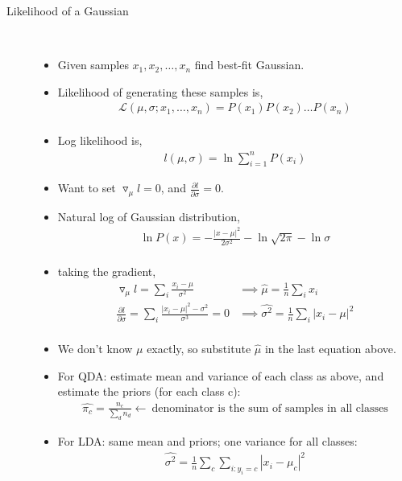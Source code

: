 \documentclass[10pt]{article}
\begin{document}
\begin{description}
	\item[Likelihood of a Gaussian]
		\
		\begin{itemize}
			\item Given samples $x_{1}, x_{2}, \dots, x_{n}$ find best-fit Gaussian.
			\item Likelihood of generating these samples is,
				\begin{align*}
					\mathcal{L}(\mu, \sigma;x_{1}, \dots, x_{n}) = P(x_{1})P(x_{2}) \dots P(x_{n})\\
				\end{align*}
			\item Log likelihood is,
				\begin{align*}
					l(\mu, \sigma) = \ln \sum_{i=1}^{n} P(x_{i})
				\end{align*}
			\item Want to set $\triangledown_{\mu} l = 0$, and  $\frac{\partial l}{\partial \sigma} = 0$.
			\item Natural log of Gaussian distribution,
				\begin{align*}
					\ln P(x) = -\frac{|x-\mu|^{2}}{2\sigma^{2}} - \ln \sqrt{2\pi} - \ln \sigma\\
				\end{align*}
			\item taking the gradient,
				\begin{align*}
					\triangledown_{\mu}l = \sum_{i} \frac{x_{i}-\mu}{\sigma^{2}} &\implies \hat{\mu} = \frac{1}{n} \sum_{i} x_{i}\\
					\frac{\partial l}{\partial \sigma} = \sum_{i} \frac{|x_{i} - \mu|^{2} - \sigma^{2}}{\sigma^{3}} = 0 &\implies \hat{\sigma^{2}} = \frac{1}{n} \sum_{i} |x_{i} - \mu|^{2}\\
				\end{align*}
			\item We don't know $\mu$ exactly, so substitute $\hat{\mu}$ in the last equation above.
			\item For QDA: estimate mean and variance of each class as above, and estimate the priors (for each class c):
				\begin{align*}
					\hat{\pi_{c}} = \frac{n_{c}}{\sum_{d} n_{d}} \leftarrow \ \text{denominator is the sum of samples in all classes}
				\end{align*}
			\item For LDA: same mean and priors; one variance for all classes:
				\begin{align*}
					\hat{\sigma^{2}} = \frac{1}{n} \sum_{c} \sum_{i:y_{i}=c} |x_{i} - \mu_{c}|^{2}
				\end{align*}
		\end{itemize}
\end{description}
\end{document}
